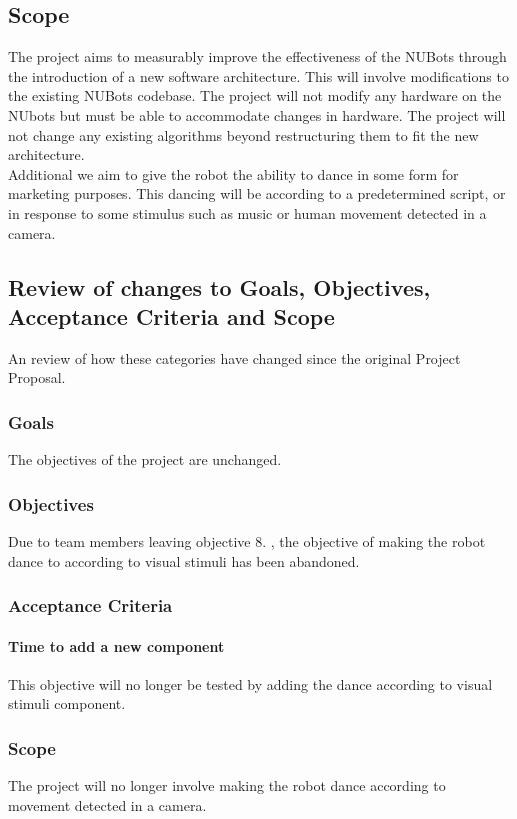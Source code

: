 \documentclass[a4paper]{article}
\begin{document}
		\subsection {Scope}
			The project aims to measurably improve the effectiveness of the NUBots through the introduction of a new software architecture. This will involve modifications to the existing NUBots codebase. The project will not modify any hardware on the NUbots but must be able to accommodate changes in hardware. The project will not change any existing algorithms beyond restructuring them to fit the new architecture.
			\\Additional we aim to give the robot the ability to dance in some form for marketing purposes. This dancing will be according to a predetermined script, or in response to some stimulus such as music or human movement detected in a camera.
				
		\subsection {Review of changes to Goals, Objectives, Acceptance Criteria and Scope}
			An review of how these categories have changed since the original Project Proposal.
			\subsubsection{Goals}
				The objectives of the project are unchanged.
			\subsubsection{Objectives}
				 Due to team members leaving objective 8. , the objective of making the robot dance to according to visual stimuli has been abandoned.
			\subsubsection{Acceptance Criteria}
				\paragraph{Time to add a new component}
					This objective will no longer be tested by adding the dance according to visual stimuli component.
			\subsubsection{Scope}
	The project will no longer involve making the robot dance according to movement detected in a camera.
\end{document}
